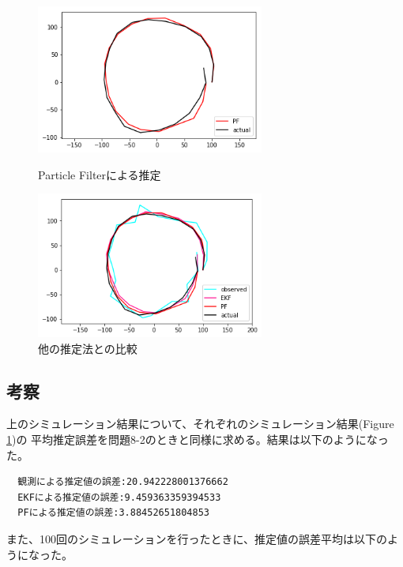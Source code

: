 \begin{figure}[htbp]
  \begin{minipage}{0.5\hsize}
    \begin{center}
      \includegraphics[width=75mm]{report8-3/PF_1/PF1.png}
    \end{center}
    \caption{Particle Filterによる推定}
    \label{pic:PF1}
  \end{minipage}
  \begin{minipage}{0.5\hsize}
    \begin{center}
      \includegraphics[width=75mm]{report8-3/PF_1/PF2.png}
    \end{center}
    \caption{他の推定法との比較}
    \label{pic:PF2}
  \end{minipage}
\end{figure}
\newpage
\subsection{考察}
上のシミュレーション結果について、それぞれのシミュレーション結果(Figure \ref{pic:PF2})の
平均推定誤差を問題8-2のときと同様に求める。結果は以下のようになった。
\begin{shadebox}
  \begin{verbatim}
  観測による推定値の誤差:20.942228001376662
  EKFによる推定値の誤差:9.459363359394533
  PFによる推定値の誤差:3.88452651804853
  \end{verbatim}
\end{shadebox}
また、100回のシミュレーションを行ったときに、推定値の誤差平均は以下のようになった。

